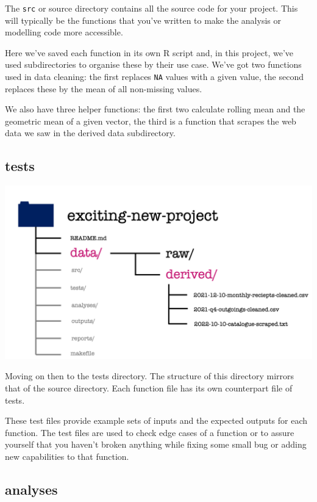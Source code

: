 \documentclass[
  12pt,
]{book}
\begin{document}
The \texttt{src} or source directory contains all the source code for your project. This will typically be the functions that you've written to make the analysis or modelling code more accessible.

Here we've saved each function in its own R script and, in this project, we've used subdirectories to organise these by their use case. We've got two functions used in data cleaning: the first replaces \texttt{NA} values with a given value, the second replaces these by the mean of all non-missing values.

We also have three helper functions: the first two calculate rolling mean and the
geometric mean of a given vector, the third is a function that scrapes the
web data we saw in the derived data subdirectory.

\hypertarget{tests}{%
\subsection{tests}\label{tests}}

\includegraphics[width=0.8\linewidth]{images/101-workflows-organising-your-work/directory-structure-drawings/directory-structure-drawing-12}

Moving on then to the tests directory. The structure of this directory mirrors that of the source directory. Each function file has its own counterpart file of tests.

These test files provide example sets of inputs and the expected outputs for each
function. The test files are used to check edge cases of a function or to assure
yourself that you haven't broken anything while fixing some small bug or adding new capabilities to that function.

\hypertarget{analyses}{%
\subsection{analyses}\label{analyses}}
\end{document}
